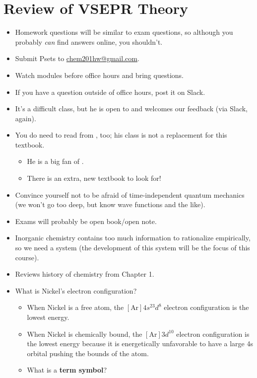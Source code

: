 \documentclass[../main.tex]{subfiles}
\begin{document}
\chapter{Review of VSEPR Theory}
\begin{itemize}
    \item {}Homework questions will be similar to exam questions, so although you probably \emph{can} find answers online, you shouldn't.
    \item Submit Psets to \href{mailto:chem201hw@gmail.com}{chem201hw@gmail.com}.
    \item Watch modules before office hours and bring questions.
    \item If you have a question outside of office hours, post it on Slack.
    \item It's a difficult class, but he is open to and welcomes our feedback (via Slack, again).
    \item You do need to read from \textcite{bib:MiesslerFischerTarr}, too; his class is not a replacement for this textbook.
    \begin{itemize}
        \item He is a big fan of \textcite{bib:Cotton}.
        \item There is an extra, new textbook to look for!
    \end{itemize}
    \item Convince yourself not to be afraid of time-independent quantum mechanics (we won't go too deep, but know wave functions and the like).
    \item Exams will probably be open book/open note.
    \item Inorganic chemistry contains too much information to rationalize empirically, so we need a system (the development of this system will be the focus of this course).
    \item Reviews history of chemistry from \textcite{bib:MiesslerFischerTarr} Chapter 1.
    \item What is Nickel's electron configuration?
    \begin{itemize}
        \item When Nickel is a free atom, the $[\text{Ar}]4s^23d^8$ electron configuration is the lowest energy.
        \item When Nickel is chemically bound, the $[\text{Ar}]3d^{10}$ electron configuration is the lowest energy because it is energetically unfavorable to have a large 4s orbital pushing the bounds of the atom.
        \item What is a \textbf{term symbol}?

\end{itemize}
\end{itemize}
\end{document}

